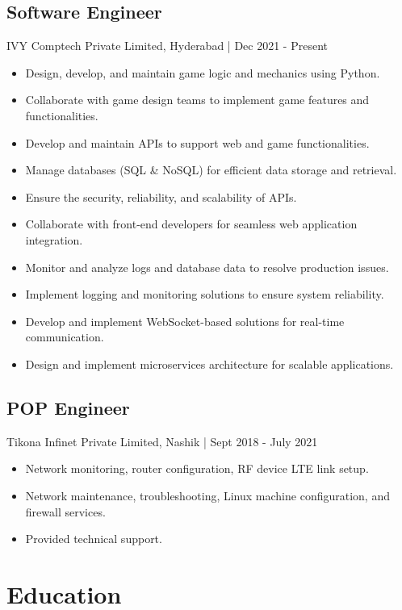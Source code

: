 \documentclass{article}%
\begin{document}
\subsection*{Software Engineer}%
\label{subsec:SoftwareEngineer}%
IVY Comptech Private Limited, Hyderabad | Dec 2021 {-} Present%
\begin{itemize}%
\item%
Design, develop, and maintain game logic and mechanics using Python.%
\item%
Collaborate with game design teams to implement game features and functionalities.%
\item%
Develop and maintain APIs to support web and game functionalities.%
\item%
Manage databases (SQL \& NoSQL) for efficient data storage and retrieval.%
\item%
Ensure the security, reliability, and scalability of APIs.%
\item%
Collaborate with front{-}end developers for seamless web application integration.%
\item%
Monitor and analyze logs and database data to resolve production issues.%
\item%
Implement logging and monitoring solutions to ensure system reliability.%
\item%
Develop and implement WebSocket{-}based solutions for real{-}time communication.%
\item%
Design and implement microservices architecture for scalable applications.%
\end{itemize}

%
\subsection*{POP Engineer}%
\label{subsec:POPEngineer}%
Tikona Infinet Private Limited, Nashik | Sept 2018 {-} July 2021%
\begin{itemize}%
\item%
Network monitoring, router configuration, RF device LTE link setup.%
\item%
Network maintenance, troubleshooting, Linux machine configuration, and firewall services.%
\item%
Provided technical support.%
\end{itemize}

%
\section*{Education}%
\label{sec:Education}%
\end{document}
